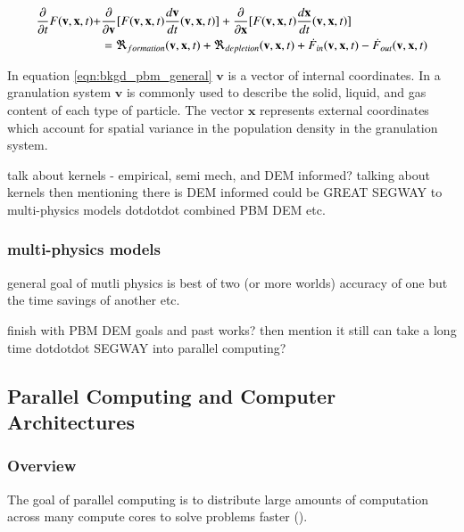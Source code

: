 \documentclass[preprint,11pt,authoryear]{elsarticle}
\begin{document}
    \begin{align}
    \frac{ \partial}{\partial t}F(\textbf{v},\textbf{x},t) +& \frac{\partial}{\partial \textbf{v}}[F(\textbf{v},\textbf{x},t)\frac{d\textbf{v}}{dt}(\textbf{v},\textbf{x},t)] + \frac{\partial}{\partial \textbf{x}}[F(\textbf{v},\textbf{x},t)\frac{d\textbf{x}}{dt}(\textbf{v},\textbf{x},t)] \notag\\
    &= \Re_{formation}(\textbf{v},\textbf{x},t)+\Re_{depletion}(\textbf{v},\textbf{x},t)+\dot{F}_{in}(\textbf{v},\textbf{x},t)-\dot{F}_{out}(\textbf{v},\textbf{x},t)
    \label{eqn:bkgd_pbm_general} 
    \end{align}
    
    \par In equation \ref{eqn:bkgd_pbm_general} $\textbf{v}$ is a vector of internal coordinates. In a granulation system $\textbf{v}$ is commonly used to describe the solid, liquid, and gas content of each type of particle. The vector $\textbf{x}$ represents external coordinates which account for spatial variance in the population density in the granulation system. 
      
    \par talk about kernels - empirical, semi mech, and DEM informed? talking about kernels then mentioning there is DEM informed could be GREAT SEGWAY to multi-physics models dotdotdot combined PBM DEM etc. 
    

    \subsubsection{multi-physics models}
	\par general goal of mutli physics is best of two (or more worlds) accuracy of one but the time savings of another etc. 
	
	
	\par finish with PBM DEM goals and past works? then mention it still can take a long time dotdotdot SEGWAY into parallel computing?


  \subsection{Parallel Computing and Computer Architectures}
    \subsubsection{Overview}
    \par The goal of parallel computing is to distribute large amounts of computation across many compute cores to solve problems faster (\cite{wilkinson2005}).
\end{document}
